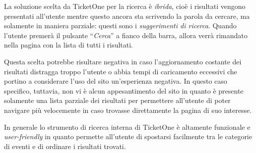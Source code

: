 	\par La soluzione scelta da TicketOne per la ricerca è \textit{ibrida}, cioè i risultati vengono presentati all'utente mentre questo ancora sta scrivendo la parola da cercare, ma solamente in maniera parziale: questi sono i \textit{suggerimenti di ricerca}.
	Quando l'utente premerà il pulsante ``\textit{Cerca}'' a fianco della barra, allora verrà rimandato nella pagina con la lista di tutti i risultati.
	\par Questa scelta potrebbe risultare negativa in caso l'aggiornamento costante dei risultati distragga troppo l'utente o abbia tempi di caricamento eccessivi che portino a considerare l'uso del sito un'esperienza negativa.
	In questo caso specifico, tuttavia, non vi è alcun appesantimento del sito in quanto è presente solamente una lista parziale dei risultati per permettere all'utente di poter navigare più velocemente in caso trovasse direttamente la pagina di suo interesse.
	\par In generale lo strumento di ricerca interna di TicketOne è altamente funzionale e \textit{user-friendly} in quanto permette all'utente di spostarsi facilmente tra le categorie di eventi e di ordinare i risultati trovati.
